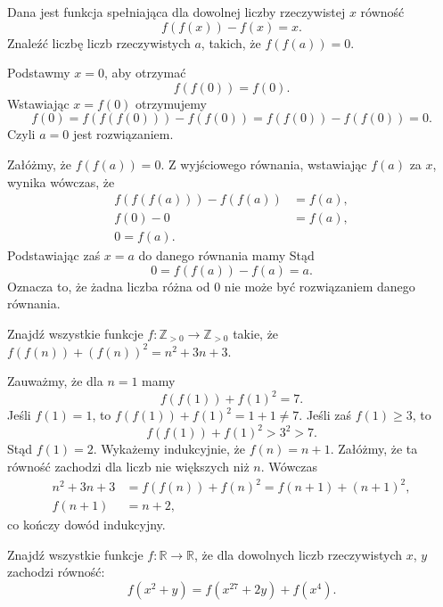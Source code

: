 \newpage
{}

\begin{problem}{1}
	Dana jest funkcja spełniająca dla dowolnej liczby rzeczywistej $x$ równość
	\[
		f(f(x)) - f(x) = x.
	\]
	Znaleźć liczbę liczb rzeczywistych $a$, takich, że $f(f(a)) = 0$.
\end{problem}


\noindent
Podstawmy $x = 0$, aby otrzymać
\[
	f(f(0)) = f(0).
\]
Wstawiając $x = f(0)$ otrzymujemy
\[
	f(0) = f(f(f(0))) - f(f(0)) = f(f(0)) - f(f(0)) = 0.
\]
Czyli $a = 0$ jest rozwiązaniem.

\vspace{10px}

\noindent
Załóżmy, że $f(f(a)) = 0$. Z wyjściowego równania, wstawiając $f(a)$ za $x$, wynika wówczas, że
\begin{align*}
	f(f(f(a))) - f(f(a)) &= f(a), \\
	f(0) - 0 &= f(a), \\
	0 = f(a).
\end{align*}
Podstawiając zaś $x = a$ do danego równania mamy
Stąd
\[
	0 = f(f(a)) - f(a) = a.
\]
Oznacza to, że żadna liczba różna od $0$ nie może być rozwiązaniem danego równania.

\begin{problem}{2}
	Znajdź wszystkie funkcje  $ f: \mathbb{Z}_{>0} \to \mathbb{Z}_{>0}$ takie, że  $f(f(n)) + (f(n))^2 = n^2 + 3n + 3$.
\end{problem}


\noindent
Zauważmy, że dla $n = 1$ mamy
\[
	f(f(1)) + f(1)^2 = 7.
\]
Jeśli $f(1) = 1$, to $f(f(1)) + f(1)^2 = 1 + 1 \neq 7$. Jeśli zaś $f(1) \geqslant 3$, to
\[
	f(f(1)) + f(1)^2 > 3^2 > 7.
\]
Stąd $f(1) = 2$. Wykażemy indukcyjnie, że $f(n) = n + 1$. Załóżmy, że ta równość zachodzi dla liczb nie większych niż $n$. Wówczas
\begin{align*}
	n^2 + 3n + 3 &= f(f(n)) + f(n)^2 = f(n + 1) + (n + 1)^2, \\
	f(n + 1) &= n + 2,
\end{align*}
co kończy dowód indukcyjny. 

\begin{problem}{3}
	Znajdź wszystkie funkcje $f:\mathbb{R} \to \mathbb{R}$, że dla dowolnych liczb rzeczywistych $x$, $y$ zachodzi równość:
	\[
		f(x^2 + y) = f(x^{27} + 2y) + f(x^4).
	\]
\end{problem}

